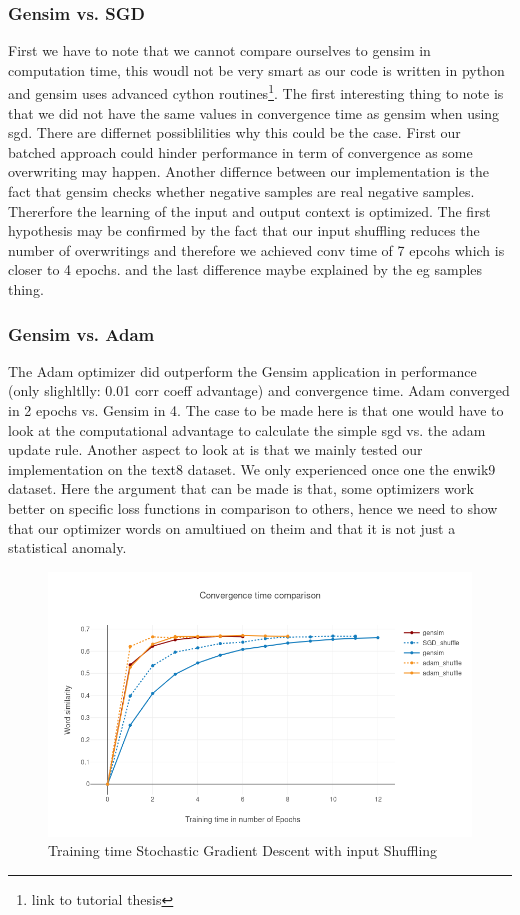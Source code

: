 \subsubsection{Gensim vs. SGD}
First we have to note that we cannot compare ourselves to gensim in computation time, this woudl not be very smart as our code is written in python and gensim uses advanced cython routines\footnote{link to tutorial thesis}. 
The first interesting thing to note is that we did not have the same values in convergence time as gensim when using sgd. There are differnet possiblilities why this could be the case. First our batched approach could hinder performance in term of convergence as some overwriting may happen. Another differnce between our implementation is the fact that gensim checks whether negative samples are real negative samples. Thererfore the learning of the input and output context is optimized. 
The first hypothesis may be confirmed by the fact that our input shuffling reduces the number of overwritings and therefore we achieved conv time of 7 epcohs which is closer to 4 epochs. and the last difference maybe explained by the eg samples thing. 

\subsubsection{Gensim vs. Adam}
The Adam optimizer did outperform the Gensim application in performance (only slighltlly: 0.01 corr coeff advantage) and convergence time. Adam converged in 2 epochs vs. Gensim in 4. The case to be made here is that one would have to look at the computational advantage to calculate the simple sgd vs.  the adam update rule. Another aspect to look at is that we mainly tested our implementation on the text8 dataset. We only experienced once one the enwik9 dataset. Here the argument that can be made is that, some optimizers work better on specific loss functions in comparison to others, hence we need to show that our optimizer words on amultiued on theim and that it is not just a statistical anomaly.

\begin{figure}[h]
    \centering
			\includegraphics[scale=0.45]{images/gensim_vs_adam} 
    \caption{Training time Stochastic Gradient Descent with input Shuffling}
    \label{fig:gensim_vs_adam}
\end{figure}


